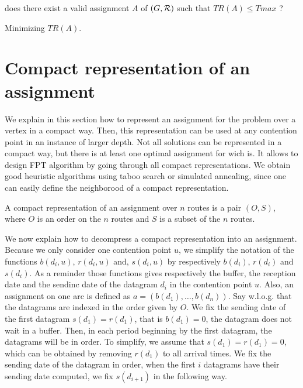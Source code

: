 \documentclass[english]{article}
\begin{document}
       does there exist a valid assignment $A$ of $(G,{\cal R})$ such that $ TR(A) \leq Tmax$ ?

       Minimizing $TR(A)$.
    
    
\section{Compact representation of an assignment}





We explain in this section how to represent an assignment for the problem 
\spall over a vertex in a compact way. Then, this representation
can be used at any contention point in an instance of larger depth.
Not all solutions can be represented in a compact way, but there
is at least one optimal assignment for \spall wich is.
It allows to design FPT algorithm by going through all compact 
representations. We obtain good heuristic algorithms using taboo search or simulated annealing, since one can easily define the neighborood of a compact representation.\\



\begin{definition}
A compact representation of an assignment over $n$ routes is a pair $(O,S)$,
where $O$ is an order on the $n$ routes and $S$ is a subset of the $n$ routes.
\end{definition}

We now explain how to decompress a compact representation into an assignment.
Because we only consider one contention point $u$, we simplify the notation of the functions $b(d_i,u)$, $r(d_i,u)$ and, $s(d_i,u)$ by respectively $b(d_i)$, $r(d_i)$ and $s(d_i)$.
As a reminder those functions gives respectively the buffer, the reception date and the sendinc date of the datagram $d_i$ in the contention point $u$. Also, an assignment on one arc is defined as $a = (b(d_1),\dots,b(d_n))$.
Say w.l.o.g. that the datagrams are indexed in the order given by $O$.
We fix the sending date of the first datagram $s(d_1) = r(d_1)$, that is $b(d_1) = 0$, the datagram does not wait in a buffer. Then, in each period beginning by the first datagram, the datagrams will be in order. To simplify, we assume that $s(d_1) = r(d_1) = 0$, which can be obtained by removing $r(d_1)$ to all arrival times. We fix the sending date of the datagram in order, when the first $i$ datagrams have their sending date computed, we fix $s(d_{i+1})$ in the following way. 
\end{document}
